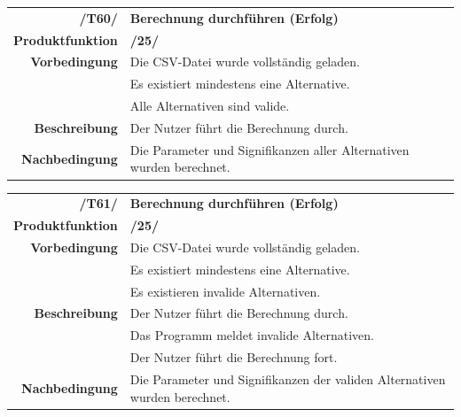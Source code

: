 \documentclass{article}
\begin{document}
\begin{table}[H]
\begin{tabularx}{\textwidth}{rX} \vspace{1mm}
\textbf{/T60/}         & \textbf{Berechnung durchführen (Erfolg)} \\ \vspace{1mm}
\textbf{Produktfunktion} & \textbf{/25/} \\
\textbf{Vorbedingung}  & Die CSV-Datei wurde vollständig geladen. \\ & Es existiert mindestens eine Alternative. \\ \vspace{1mm} & Alle Alternativen sind valide. \\ \vspace{1mm}
\textbf{Beschreibung}  & Der Nutzer führt die Berechnung durch. \\
\textbf{Nachbedingung} & Die Parameter und Signifikanzen aller Alternativen wurden berechnet.
\end{tabularx}
\end{table}

\begin{table}[H]
\begin{tabularx}{\textwidth}{rX} \vspace{1mm}
\textbf{/T61/}         & \textbf{Berechnung durchführen (Erfolg)} \\ \vspace{1mm}
\textbf{Produktfunktion} & \textbf{/25/} \\
\textbf{Vorbedingung}  & Die CSV-Datei wurde vollständig geladen. \\ & Es existiert mindestens eine Alternative. \\ \vspace{1mm} & Es existieren invalide Alternativen. \\
\textbf{Beschreibung}  & Der Nutzer führt die Berechnung durch. \\ & Das Programm meldet invalide Alternativen. \\ \vspace{1mm} & Der Nutzer führt die Berechnung fort. \\
\textbf{Nachbedingung} & Die Parameter und Signifikanzen der validen Alternativen wurden berechnet.
\end{tabularx}
\end{table}
\end{document}
